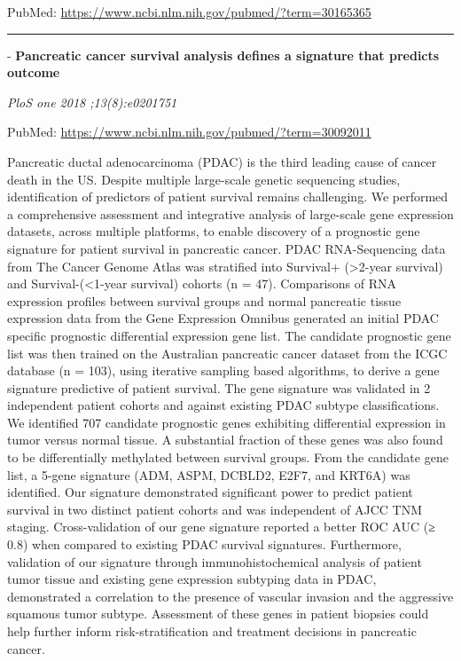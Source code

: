 \documentclass[]{article}
\begin{document}
PubMed: \url{https://www.ncbi.nlm.nih.gov/pubmed/?term=30165365}

{}

{}

\begin{center}\rule{0.5\linewidth}{\linethickness}\end{center}

 - \textbf{Pancreatic cancer survival analysis defines a signature that
predicts outcome}

\emph{PloS one 2018 ;13(8):e0201751}

PubMed: \url{https://www.ncbi.nlm.nih.gov/pubmed/?term=30092011}

Pancreatic ductal adenocarcinoma (PDAC) is the third leading cause of
cancer death in the US. Despite multiple large-scale genetic sequencing
studies, identification of predictors of patient survival remains
challenging. We performed a comprehensive assessment and integrative
analysis of large-scale gene expression datasets, across multiple
platforms, to enable discovery of a prognostic gene signature for
patient survival in pancreatic cancer. PDAC RNA-Sequencing data from The
Cancer Genome Atlas was stratified into Survival+ (\textgreater{}2-year
survival) and Survival-(\textless{}1-year survival) cohorts (n = 47).
Comparisons of RNA expression profiles between survival groups and
normal pancreatic tissue expression data from the Gene Expression
Omnibus generated an initial PDAC specific prognostic differential
expression gene list. The candidate prognostic gene list was then
trained on the Australian pancreatic cancer dataset from the ICGC
database (n = 103), using iterative sampling based algorithms, to derive
a gene signature predictive of patient survival. The gene signature was
validated in 2 independent patient cohorts and against existing PDAC
subtype classifications. We identified 707 candidate prognostic genes
exhibiting differential expression in tumor versus normal tissue. A
substantial fraction of these genes was also found to be differentially
methylated between survival groups. From the candidate gene list, a
5-gene signature (ADM, ASPM, DCBLD2, E2F7, and KRT6A) was identified.
Our signature demonstrated significant power to predict patient survival
in two distinct patient cohorts and was independent of AJCC TNM staging.
Cross-validation of our gene signature reported a better ROC AUC (≥ 0.8)
when compared to existing PDAC survival signatures. Furthermore,
validation of our signature through immunohistochemical analysis of
patient tumor tissue and existing gene expression subtyping data in
PDAC, demonstrated a correlation to the presence of vascular invasion
and the aggressive squamous tumor subtype. Assessment of these genes in
patient biopsies could help further inform risk-stratification and
treatment decisions in pancreatic cancer.
\end{document}
